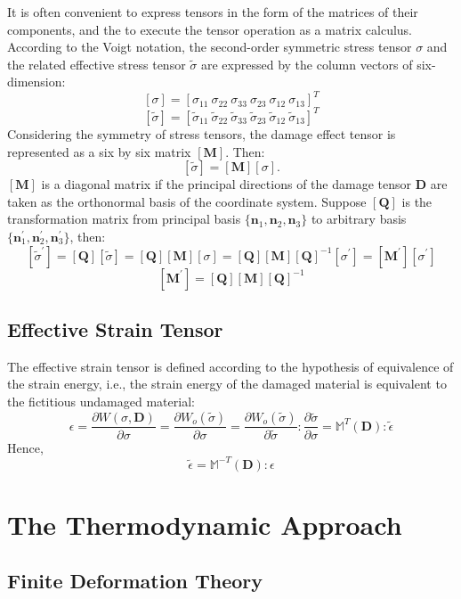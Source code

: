 \documentclass[11pt,fullpage]{article}
\begin{document}
It is often convenient to express tensors in the form of the matrices
of their components, and the to execute the tensor operation as a
matrix calculus. According to the Voigt notation, the second-order
symmetric stress tensor $\sigma$ and the related effective stress
tensor $\tilde{\sigma}$ are expressed by the column vectors of
six-dimension:
$$
[\sigma] = [\sigma_{11}\ \sigma_{22}\ \sigma_{33}\ \sigma_{23}\
\sigma_{12}\ \sigma_{13}]^T
$$
$$
[\tilde{\sigma}] = [\tilde{\sigma}_{11}\ \tilde{\sigma}_{22}\
\tilde{\sigma}_{33}\ \tilde{\sigma}_{23}\ \tilde{\sigma}_{12}\ \tilde{\sigma}_{13}]^T
$$
Considering the symmetry of stress tensors, the damage effect tensor
is represented as a six by six matrix $[\bm{M}]$. Then:
$$
[\tilde{\sigma}] = [\bm{M}][\sigma].
$$
$[\bm{M}]$ is a
diagonal matrix if the principal directions of the damage tensor
$\bm{D}$ are taken as the orthonormal basis of the coordinate
system. Suppose $[\bm{Q}]$ is the transformation matrix from principal
basis $\{\bm{n}_1,\bm{n}_2,\bm{n}_3\}$ to arbitrary basis $\{\bm{n}_1^{'},\bm{n}_2^{'},\bm{n}_3^{'}\}$, then:
$$
 [\tilde{\sigma}^{'}] = [\bm{Q}][\tilde{\sigma}] =
 [\bm{Q}][\bm{M}][\sigma] = [\bm{Q}][\bm{M}][\bm{Q}]^{-1}[\sigma^{'}] = [\bm{M}^{'}][\sigma^{'}] 
$$
$$
[\bm{M}^{'}] = [\bm{Q}][\bm{M}][\bm{Q}]^{-1}
$$

\subsection{Effective Strain Tensor}

The effective strain tensor is defined according to the hypothesis of
equivalence of the strain energy, i.e., the strain energy of the
damaged material is equivalent to the fictitious undamaged material:
$$
\epsilon = \frac{\partial{W(\sigma,\bm{D})}}{\partial{\sigma}}
         = \frac{\partial{W_o(\tilde{\sigma})}}{\partial{\sigma}}
         =
         \frac{\partial{W_o(\tilde{\sigma})}}{\partial{\tilde{\sigma}}}:
           \frac{\partial{\tilde{\sigma}}}{\partial{\sigma}}
         = \mathbb{M}^T(\bm{D}):\tilde{\epsilon}
$$
Hence,
$$
\tilde{\epsilon} = \mathbb{M}^{-T}(\bm{D}):\epsilon
$$

\section{The Thermodynamic Approach}

\subsection{Finite Deformation Theory}
\end{document}
